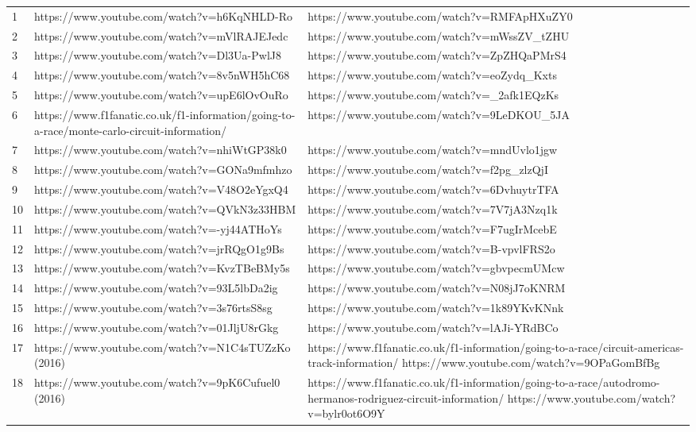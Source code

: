 \documentclass{article}
\begin{document}
\begin{tabularx}{.6\textwidth}{Xll}
1 & https://www.youtube.com/watch?v=h6KqNHLD-Ro & https://www.youtube.com/watch?v=RMFApHXuZY0 \\
2 & https://www.youtube.com/watch?v=mVlRAJEJedc & https://www.youtube.com/watch?v=mWssZV_tZHU \\
3 & https://www.youtube.com/watch?v=Dl3Ua-PwlJ8 & https://www.youtube.com/watch?v=ZpZHQaPMrS4 \\
4 & https://www.youtube.com/watch?v=8v5nWH5hC68 & https://www.youtube.com/watch?v=eoZydq_Kxts \\
5 & https://www.youtube.com/watch?v=upE6lOvOuRo & https://www.youtube.com/watch?v=_2afk1EQzKs \\
6 & https://www.f1fanatic.co.uk/f1-information/going-to-a-race/monte-carlo-circuit-information/ & https://www.youtube.com/watch?v=9LeDKOU_5JA \\
7 & https://www.youtube.com/watch?v=nhiWtGP38k0 & https://www.youtube.com/watch?v=mndUvlo1jgw \\
8 & https://www.youtube.com/watch?v=GONa9mfmhzo & https://www.youtube.com/watch?v=f2pg_zlzQjI \\
9 & https://www.youtube.com/watch?v=V48O2eYgxQ4 & https://www.youtube.com/watch?v=6DvhuytrTFA \\
10 & https://www.youtube.com/watch?v=QVkN3z33HBM & https://www.youtube.com/watch?v=7V7jA3Nzq1k \\
11 & https://www.youtube.com/watch?v=-yj44ATHoYs & https://www.youtube.com/watch?v=F7ugIrMcebE \\
12 & https://www.youtube.com/watch?v=jrRQgO1g9Bs & https://www.youtube.com/watch?v=B-vpvlFRS2o \\
13 & https://www.youtube.com/watch?v=KvzTBeBMy5s & https://www.youtube.com/watch?v=gbvpecmUMcw \\
14 & https://www.youtube.com/watch?v=93L5lbDa2ig & https://www.youtube.com/watch?v=N08jJ7oKNRM \\
15 & https://www.youtube.com/watch?v=3s76rtsS8sg & https://www.youtube.com/watch?v=1k89YKvKNnk \\
16 & https://www.youtube.com/watch?v=01JljU8rGkg & https://www.youtube.com/watch?v=lAJi-YRdBCo \\
17 & https://www.youtube.com/watch?v=N1C4sTUZzKo (2016) & https://www.f1fanatic.co.uk/f1-information/going-to-a-race/circuit-americas-track-information/ https://www.youtube.com/watch?v=9OPaGomBfBg \\
18 & https://www.youtube.com/watch?v=9pK6Cufuel0 (2016) & https://www.f1fanatic.co.uk/f1-information/going-to-a-race/autodromo-hermanos-rodriguez-circuit-information/ https://www.youtube.com/watch?v=bylr0ot6O9Y\\

\end{tabularx}
\end{document}

